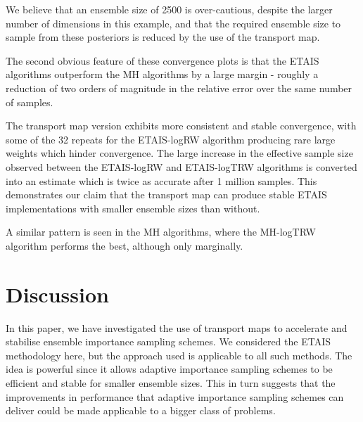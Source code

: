 \documentclass[final]{siamltex}
\newcommand{\edit}[1]{{\color{red} #1}}
\begin{document}
We believe that an ensemble size of 2500
is over-cautious, despite the larger number of dimensions in this
example, and that the required ensemble size to sample
from these posteriors is reduced by the use of the transport map.

The second obvious feature of these convergence plots is that the ETAIS
algorithms outperform the MH algorithms by a large margin - roughly a
reduction of two orders of magnitude in the relative error over the
same number of samples.


\edit{The transport map version exhibits more
consistent and stable convergence, with some of the 32 repeats for the
ETAIS-logRW algorithm producing rare large weights which hinder convergence.}
The large increase in the effective sample size
observed between the ETAIS-logRW and ETAIS-logTRW algorithms is
converted into an estimate which is twice as accurate after 1 million
samples. This demonstrates our claim that the transport map can
produce stable ETAIS implementations with smaller ensemble sizes than without.

\edit{A similar pattern is seen in the MH algorithms, where the MH-logTRW algorithm performs the best,
although only marginally. }

\section{Discussion}\label{sec:conc}
In this paper, we have investigated the use of transport maps to
accelerate and stabilise ensemble importance sampling schemes. We
considered the ETAIS methodology here, but the approach used is
applicable to all such methods. The idea is powerful since it allows
adaptive importance sampling schemes to be efficient and stable for
smaller ensemble sizes. This in turn suggests that the improvements in
performance that adaptive importance sampling schemes can deliver
could be made applicable to a bigger class of problems.
\end{document}
